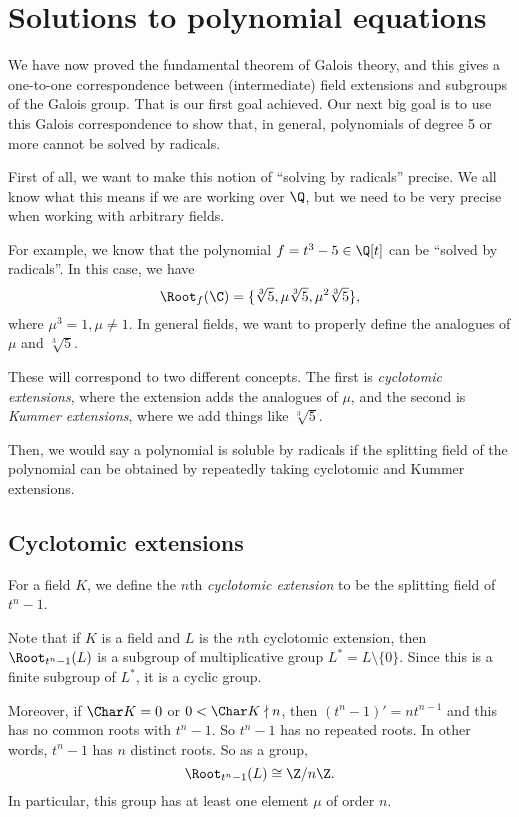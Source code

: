 \documentclass[a4paper]{article}
\begin{document}
\section{Solutions to polynomial equations}
We have now proved the fundamental theorem of Galois theory, and this gives a one-to-one correspondence between (intermediate) field extensions and subgroups of the Galois group. That is our first goal achieved. Our next big goal is to use this Galois correspondence to show that, in general, polynomials of degree 5 or more cannot be solved by radicals.

First of all, we want to make this notion of ``solving by radicals'' precise. We all know what this means if we are working over $\Q$, but we need to be very precise when working with arbitrary fields.

For example, we know that the polynomial $f = t^3 - 5 \in \Q[t]$ can be ``solved by radicals''. In this case, we have
\[
  \Root_f(\C) = \{\sqrt[3]{5}, \mu \sqrt[3]{5}, \mu^2\sqrt[3]{5}\},
\]
where $\mu^3 = 1, \mu \not= 1$. In general fields, we want to properly define the analogues of $\mu$ and $\sqrt[3]{5}$.

These will correspond to two different concepts. The first is \emph{cyclotomic extensions}, where the extension adds the analogues of $\mu$, and the second is \emph{Kummer extensions}, where we add things like $\sqrt[3]{5}$.

Then, we would say a polynomial is soluble by radicals if the splitting field of the polynomial can be obtained by repeatedly taking cyclotomic and Kummer extensions.

\subsection{Cyclotomic extensions}
\begin{defi}
  For a field $K$, we define the $n$th \emph{cyclotomic extension} to be the splitting field of $t^n - 1$.
\end{defi}
Note that if $K$ is a field and $L$ is the $n$th cyclotomic extension, then $\Root_{t^n - 1}(L)$ is a subgroup of multiplicative group $L^* = L\setminus \{0\}$. Since this is a finite subgroup of $L^*$, it is a cyclic group.

Moreover, if $\Char K = 0$ or $0 < \Char K \nmid n$, then $(t^n - 1)' = nt^{n - 1}$ and this has no common roots with $t^n - 1$. So $t^n - 1$ has no repeated roots. In other words, $t^n - 1$ has $n$ distinct roots. So as a group,
\[
  \Root_{t^n - 1}(L) \cong \Z/n\Z.
\]
In particular, this group has at least one element $\mu$ of order $n$.
\end{document}
